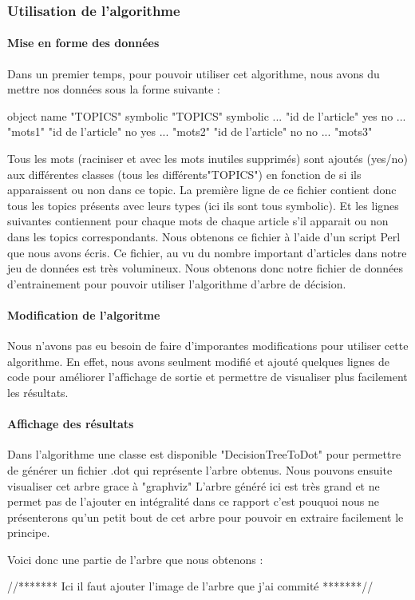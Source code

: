 \subsubsection{Utilisation de l'algorithme}

\paragraph{Mise en forme des données}  
Dans un premier temps, pour pouvoir utiliser cet algorithme, nous avons du mettre nos données sous la forme suivante :

object name "TOPICS" symbolic "TOPICS" symbolic ...
"id de l'article" yes no ... "mots1"
"id de l'article" no yes ... "mots2"
"id de l'article" no no ... "mots3"

Tous les mots (raciniser et avec les mots inutiles supprimés) sont ajoutés (yes/no) aux différentes classes (tous les différents"TOPICS") en fonction de si ils apparaissent ou non dans ce topic.
La première ligne de ce fichier contient donc tous les topics présents avec leurs types (ici ils sont tous symbolic). Et les lignes suivantes contiennent pour chaque mots de chaque article s'il apparait ou non dans les topics correspondants.
Nous obtenons ce fichier à l'aide d'un script Perl que nous avons écris. Ce fichier, au vu du nombre important d'articles dans notre jeu de données est très volumineux. Nous obtenons donc notre fichier de données d'entrainement pour pouvoir utiliser l'algorithme d'arbre de décision.

\paragraph{Modification de l'algoritme}  
Nous n'avons pas eu besoin de faire d'imporantes modifications pour utiliser cette algorithme. En effet, nous avons seulment modifié et ajouté quelques lignes de code pour améliorer l'affichage de sortie et permettre de visualiser plus facilement les résultats.

\paragraph{Affichage des résultats}
Dans l'algorithme une classe est disponible "DecisionTreeToDot" pour permettre de générer un fichier .dot qui représente l'arbre obtenus. Nous pouvons ensuite visualiser cet arbre grace à "graphviz"
L'arbre généré ici est très grand et ne permet pas de l'ajouter en intégralité dans ce rapport c'est pouquoi nous ne présenterons qu'un petit bout de cet arbre pour pouvoir en extraire facilement le principe. 

Voici donc une partie de l'arbre que nous obtenons :

//******* Ici il faut ajouter l'image de l'arbre que j'ai commité *******//

